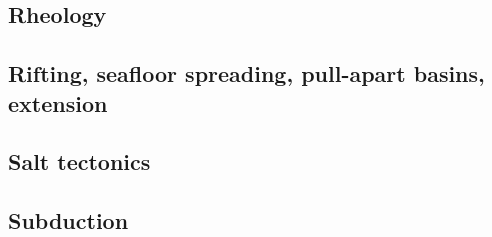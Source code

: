 \cite{reyu00}
\cite{reyu03}
\cite{reyu04}
\cite{rehy06}\cite{rewr06}
\cite{rerw08}
\cite{reps09}
\cite{revp13}

\subsection*{Rheology}

\cite{druc51}
\cite{hafn51}
\cite{drpr52}
\cite{hand69}
\cite{delo81}
\cite{rafi84}
\cite{wica90}
\cite{wasd96}
\cite{rydr00}\cite{rana00}
\cite{lova01}
\cite{hirt02}
\cite{hiko03}
\cite{didr05}\cite{drur05}
\cite{rygw06}
\cite{hirw07}
\cite{lemm08}
\cite{lell11}
\cite{reyn12}
\cite{lepo13}


\subsection*{Rifting, seafloor spreading, pull-apart basins, extension}

\cite{hoen86b}
\cite{trbr91}
\cite{zieg92b}
\cite{dusa96}
\cite{rafm98}
\cite{hupc01}
\cite{hube02}\cite{hani02}\cite{dabm02}
\cite{hube03}\cite{hani03}
\cite{hier04}
\cite{hubb05}
\cite{tibs06}
\cite{huha07}
\cite{agcz09}
\cite{aubh10}
\cite{alht11}
\cite{alht12}
\cite{alhf13}
\cite{hebr14}\cite{lige14}
\cite{nabu15}
\cite{olbm16}\cite{jekm16}
\cite{lemh17}
\cite{lisp19}

\subsection*{Salt tectonics}

\cite{tars91}
\cite{zaju92}
\cite{nabr93}
\cite{istt04}
\cite{huja07}

\subsection*{Subduction}

\cite{thar85}
\cite{jarr86}
\cite{boww89}
\cite{hstt90}
\cite{zhgu92}\cite{whbw92}
\cite{jope93}\cite{dvnm93}
\cite{zhgu94}\cite{wibe94}\cite{wdbo94a}\cite{wdbo94b}
\cite{hajc97}
\cite{itki98}
\cite{hagu99}
\cite{tesc00}
\cite{refm03}
\cite{toba04}
\cite{jalo05}\cite{lahb05}
\cite{degw06}\cite{rohu06}
\cite{artd07}\cite{yaab07}
\cite{yaba08}\cite{ozrs08}\cite{dihf08}\cite{wabj08}\cite{wabj08b}
\cite{yahb09}
\cite{hagr10}\cite{lobh10}
\cite{lixg11}\cite{list11}
\cite{anwb12}\cite{jahu12}\cite{jabi12}\cite{jabk12}\cite{lixg12}\cite{lixg13}\cite{ronb12}\cite{tebu12}
\cite{thka12}
\cite{nabg13}\cite{hage13}\cite{ancv13}\cite{namu13}\cite{yosh13}\cite{zhgt13}\cite{jabr13}\cite{izht13}
\cite{luws13}\cite{dusc13}\cite{tibb13}
\cite{robn14}\cite{hond14}\cite{ronc14}
\cite{tomy16}

